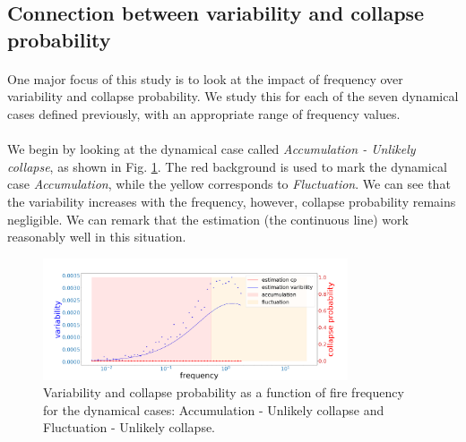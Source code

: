 \documentclass{article}
\begin{document}



\newpage
\subsection{Connection between variability and collapse probability}

\label{impact_freq}

\paragraph{}
One major focus of this study is to look at the impact of frequency over variability and collapse probability. We study this for each of the seven dynamical cases defined previously, with an appropriate range of frequency values.

\paragraph{}
We begin by looking at the dynamical case called \textit{Accumulation - Unlikely collapse}, as shown in Fig. \ref{fig:vcp1}. The red background is used to mark the dynamical case \textit{Accumulation}, while the yellow corresponds to \textit{Fluctuation}. We can see that the variability increases with the frequency, however, collapse probability remains negligible. We can remark that the estimation (the continuous line) work reasonably well in this situation.

\begin{figure}[h!]
\begin{center}
\includegraphics[width=9cm]{results/measures_acc_unlikely.png}
\end{center}
\caption{\label{fig:vcp1}Variability and collapse probability as a function of fire frequency for the dynamical cases: Accumulation - Unlikely collapse and Fluctuation - Unlikely collapse.}
\end{figure}
\end{document}
